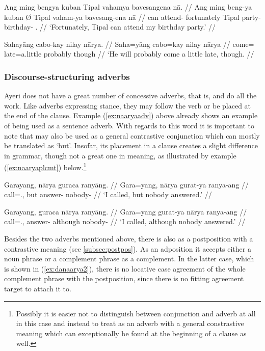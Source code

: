 \pex\label{ex:stanceadv}
\a \begingl
	\gla Ang ming bengya kuban {} Tipal vahamya bavesangena nā. //
	\glb Ang ming beng-ya kuban Ø Tipal vaham-ya bavesang-ena nā //
	\glc \AgtT{} can attend-\TsgM{} fortunately \Top{} Tipal party-\Loc{} 
		birthday-\Gen{} \Fsg{}.\Gen{} //
	\glft `Fortunately, Tipal can attend my birthday party.' //
\endgl

\a\label{ex:naaryaadv} \begingl
	\gla Sahayāng cabo-kay nilay nārya. //
	\glb Saha=yāng cabo=kay nilay nārya //
	\glc come=\TsgM{} late=a.little probably though //
	\glft `He will probably come a little late, though. //
\endgl
\xe

\subsubsection{Discourse-structuring adverbs}

Ayeri does not have a great number of concessive adverbs, that is, 
 and  do all the work. Like adverbs expressing stance, they may 
follow the verb or be placed at the end of the clause. Example 
(\ref{ex:naaryaadv}) above already shows an example of  
being used as a sentence adverb. With regards to this word it is important to 
note that  may also be used as a general contrastive 
conjunction which can mostly be translated as `but'. Insofar, its placement in 
a clause creates a slight difference in grammar, though not a great one in 
meaning, as illustrated by example (\ref{ex:naaryaplcmt}) 
below.\footnote{Possibly it is easier not to distinguish between conjunction 
and adverb at all in this case and instead to treat  as an 
adverb with a general constrastive meaning which can exceptionally be found at 
the beginning of a clause as well.}

\pex\label{ex:naaryaplcmt}
\a\label{ex:naaryaconj}\begingl
	\gla Garayang, nārya guraca ranyāng. //
	\glb Gara=yang, nārya gurat-ya ranya-ang //
	\glc call=\Fsg{}.\Aarg{}, but answer-\TsgM{} nobody-\Aarg{} //
	\glft `I called, but nobody answered.' //
\endgl

\a\label{ex:naaryaadv2}\begingl
	\gla Garayang, guraca nārya ranyāng. //
	\glb Gara=yang gurat-ya nārya ranya-ang //
	\glc call=\Fsg{}.\Aarg{}, answer-\TsgM{} although nobody-\Aarg{} //
	\glft `I called, although nobody answered.' //
\endgl

\xe

Besides the two adverbs mentioned above, there is also 
 as a postposition 
with a contrastive meaning (see \autoref{subsec:postpos}). As an adposition it  
accepts either a noun phrase or a complement phrase as a complement. In the 
latter case, which is shown in (\ref{ex:danaarya2}), there is no locative case 
agreement of the whole complement phrase with the postposition, since there is 
no fitting agreement target to attach it to.

